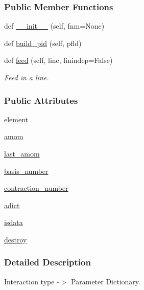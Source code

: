 \subsubsection*{Public Member Functions}
\begin{DoxyCompactItemize}
\item 
def \hyperlink{classsrc_1_1psi4io_1_1GBS__Reader_a901ed27550f388599362cba17422d34c}{\+\_\+\+\_\+init\+\_\+\+\_\+} (self, fnm=None)
\item 
def \hyperlink{classsrc_1_1psi4io_1_1GBS__Reader_a3fe8a2cd7730bab06ba2fda9dd11cf6d}{build\+\_\+pid} (self, pfld)
\item 
def \hyperlink{classsrc_1_1psi4io_1_1GBS__Reader_a66aa5de319783c2cd7337d436e6a64de}{feed} (self, line, linindep=False)
\begin{DoxyCompactList}\small\item\em Feed in a line. \end{DoxyCompactList}\end{DoxyCompactItemize}
\subsubsection*{Public Attributes}
\begin{DoxyCompactItemize}
\item 
\hyperlink{classsrc_1_1psi4io_1_1GBS__Reader_ae3b9e16a6ec2c8bd4a8dbb9c73a6e344}{element}
\item 
\hyperlink{classsrc_1_1psi4io_1_1GBS__Reader_a53d49061d48c5774301a1e7af0f35567}{amom}
\item 
\hyperlink{classsrc_1_1psi4io_1_1GBS__Reader_a4e6461f91b1a71d9287537c746d5117b}{last\+\_\+amom}
\item 
\hyperlink{classsrc_1_1psi4io_1_1GBS__Reader_a3eb1a527ce59df64b659c7304df8114b}{basis\+\_\+number}
\item 
\hyperlink{classsrc_1_1psi4io_1_1GBS__Reader_a0e7c54314202d03e6ecd728a87985da5}{contraction\+\_\+number}
\item 
\hyperlink{classsrc_1_1psi4io_1_1GBS__Reader_ad5401ec91a009c2e9d1131340f2d310b}{adict}
\item 
\hyperlink{classsrc_1_1psi4io_1_1GBS__Reader_a2e3d80828bae7b82a292e4d54c90881e}{isdata}
\item 
\hyperlink{classsrc_1_1psi4io_1_1GBS__Reader_ab9667b5604854f7bb371635ce2e60db2}{destroy}
\end{DoxyCompactItemize}


\subsubsection{Detailed Description}
Interaction type -\/$>$ Parameter Dictionary. 

